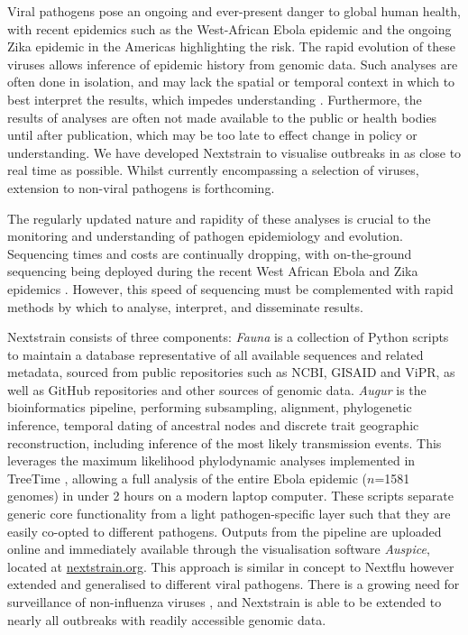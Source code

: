 \documentclass{bioinfo}
\begin{document}
\maketitle

Viral pathogens pose an ongoing and ever-present danger to global human health, with recent epidemics such as the West-African Ebola epidemic and the ongoing Zika epidemic in the Americas highlighting the risk.
The rapid evolution of these viruses allows inference of epidemic history from genomic data.
Such analyses are often done in isolation, and may lack the spatial or temporal context in which to best interpret the results, which impedes understanding \citep{pybus2013evolutionary}.
Furthermore, the results of analyses are often not made available to the public or health bodies until after publication, which may be too late to effect change in policy or understanding.
We have developed Nextstrain to visualise outbreaks in as close to real time as possible.
Whilst currently encompassing a selection of viruses, extension to non-viral pathogens is forthcoming.

The regularly updated nature and rapidity of these analyses is crucial to the monitoring and understanding of pathogen epidemiology and evolution.
Sequencing times and costs are continually dropping, with on-the-ground sequencing being deployed during the recent West African Ebola and Zika epidemics \citep{quick2016real,faria2017epidemic}.
However, this speed of sequencing must be complemented with rapid methods by which to analyse, interpret, and disseminate results.

Nextstrain consists of three components:
\textit{Fauna} is a collection of Python scripts to maintain a database representative of all available sequences and related metadata, sourced from public repositories such as NCBI, GISAID and ViPR, as well as GitHub repositories and other sources of genomic data.
\textit{Augur} is the bioinformatics pipeline, performing subsampling, alignment, phylogenetic inference, temporal dating of ancestral nodes and discrete trait geographic reconstruction, including inference of the most likely transmission events.
This leverages the maximum likelihood phylodynamic analyses implemented in TreeTime \citep{sagulenko2017treetime}, allowing a full analysis of the entire Ebola epidemic ($n$=1581 genomes) in under 2 hours on a modern laptop computer.
These scripts separate generic core functionality from a light pathogen-specific layer such that they are easily co-opted to different pathogens.
Outputs from the pipeline are uploaded online and immediately available through the visualisation software \textit{Auspice}, located at \href{http://nextstrain.org}{nextstrain.org}.
This approach is similar in concept to Nextflu \citep{neher2015nextflu} however extended and generalised to different viral pathogens.
There is a growing need for surveillance of non-influenza viruses \citep{tang2017global}, and Nextstrain is able to be extended to nearly all outbreaks with readily accessible genomic data.
\end{document}
